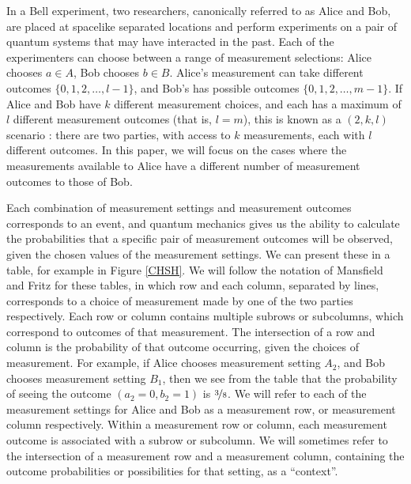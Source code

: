 \documentclass[reprint]{revtex4-1}
\theoremstyle{definition}
\begin{document}
In a Bell experiment, two researchers, canonically referred to as Alice and Bob, are placed at spacelike separated locations and perform experiments on a pair of quantum systems that may have interacted in the past. Each of the experimenters can choose between a range of measurement selections: Alice chooses $a\in A$, Bob chooses $b\in B$. Alice's measurement can take different outcomes $\{0,1,2,\dots,l-1\}$, and Bob's has possible outcomes $\{0,1,2,\dots,m-1\}$. If Alice and Bob have $k$ different measurement choices, and each has a maximum of $l$ different measurement outcomes (that is, $l=m$), this is known as a $(2,k,l)$ scenario \cite{Mans2011,Abra2013}: there are two parties, with access to $k$ measurements, each with $l$ different outcomes. In this paper, we will focus on the cases where the measurements available to Alice have a different number of measurement outcomes to those of Bob.

Each combination of measurement settings and measurement outcomes corresponds to an event, and quantum mechanics gives us the ability to calculate the probabilities that a specific pair of measurement outcomes will be observed, given the chosen values of the measurement settings. We can present these in a table, for example in Figure \ref{CHSH}. We will follow the notation of Mansfield and Fritz for these tables, in which row and each column, separated by lines, corresponds to a choice of measurement made by one of the two parties respectively. Each row or column contains multiple subrows or subcolumns, which correspond to outcomes of that measurement. The intersection of a row and column is the probability of that outcome occurring, given the choices of measurement.  For example, if Alice chooses measurement setting $A_2$, and Bob chooses measurement setting $B_1$, then we see from the table that the probability of seeing the outcome $(a_2=0, b_2=1)$ is $\nicefrac38$. We will refer to each of the measurement settings for Alice and Bob as a measurement row, or measurement column respectively. Within a measurement row or column, each measurement outcome is associated with a subrow or subcolumn. We will sometimes refer to the intersection of a measurement row and a measurement column, containing the outcome probabilities or possibilities for that setting, as a ``context''.
\end{document}

